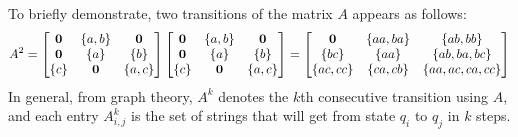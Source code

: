\begin{example}
  To briefly demonstrate, two transitions of the matrix \(A\) appears as
  follows:
  \begin{align*}
    A^2 =
      \begin{bmatrix}
        \mathbf{0} & \left\{a, b\right\} & \mathbf{0} \\
        \mathbf{0} & \left\{a\right\} & \left\{b\right\} \\
        \left\{c\right\} & \mathbf{0} & \left\{a, c\right\}
      \end{bmatrix} 
      \begin{bmatrix}
        \mathbf{0} & \left\{a, b\right\} & \mathbf{0} \\
        \mathbf{0} & \left\{a\right\} & \left\{b\right\} \\
        \left\{c\right\} & \mathbf{0} & \left\{a, c\right\}
      \end{bmatrix}
      =
      \begin{bmatrix}
        \mathbf{0} & \left\{aa, ba\right\} & \left\{ab, bb\right\} \\
        \left\{bc\right\} & \left\{aa\right\} & \left\{ab, ba, bc\right\} \\
        \left\{ac, cc\right\} & \left\{ca, cb\right\} & \left\{aa, ac, ca, cc\right\}
      \end{bmatrix}
  \end{align*}
  In general, from graph theory, \(A^k\) denotes the \(k\)th consecutive
  transition using \(A\),
  and each entry \(A^k _{i, j}\) is the set of strings that will
  get from state \(q_i\) to \(q_j\) in \(k\) steps.

\end{example}



